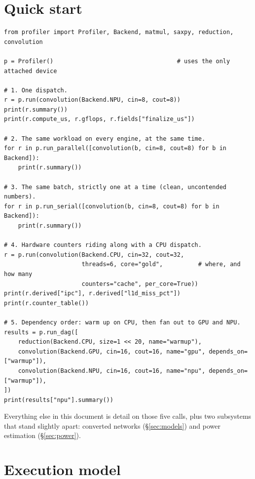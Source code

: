 \documentclass[11pt,a4paper]{article}
\begin{document}
\section{Quick start}

\begin{lstlisting}
from profiler import Profiler, Backend, matmul, saxpy, reduction, convolution

p = Profiler()                                   # uses the only attached device

# 1. One dispatch.
r = p.run(convolution(Backend.NPU, cin=8, cout=8))
print(r.summary())
print(r.compute_us, r.gflops, r.fields["finalize_us"])

# 2. The same workload on every engine, at the same time.
for r in p.run_parallel([convolution(b, cin=8, cout=8) for b in Backend]):
    print(r.summary())

# 3. The same batch, strictly one at a time (clean, uncontended numbers).
for r in p.run_serial([convolution(b, cin=8, cout=8) for b in Backend]):
    print(r.summary())

# 4. Hardware counters riding along with a CPU dispatch.
r = p.run(convolution(Backend.CPU, cin=32, cout=32,
                      threads=6, core="gold",          # where, and how many
                      counters="cache", per_core=True))
print(r.derived["ipc"], r.derived["l1d_miss_pct"])
print(r.counter_table())

# 5. Dependency order: warm up on CPU, then fan out to GPU and NPU.
results = p.run_dag([
    reduction(Backend.CPU, size=1 << 20, name="warmup"),
    convolution(Backend.GPU, cin=16, cout=16, name="gpu", depends_on=["warmup"]),
    convolution(Backend.NPU, cin=16, cout=16, name="npu", depends_on=["warmup"]),
])
print(results["npu"].summary())
\end{lstlisting}

\noindent Everything else in this document is detail on those five calls, plus
two subsystems that stand slightly apart: converted networks
(\S\ref{sec:models}) and power estimation (\S\ref{sec:power}).

\section{Execution model}
\end{document}
